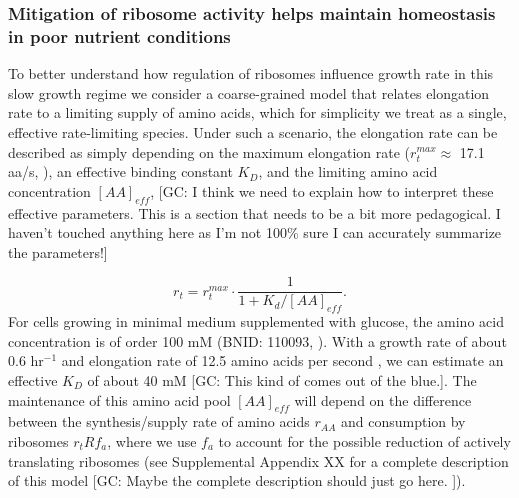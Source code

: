 \subsubsection{Mitigation of ribosome activity helps maintain homeostasis in
poor nutrient conditions}

To better understand how regulation of ribosomes influence growth rate in this
slow growth regime  we consider a coarse-grained model that relates elongation
rate to a limiting supply of amino acids, which for simplicity we treat as a
single, effective rate-limiting species. Under such a scenario, the elongation
rate can be described as simply depending on the maximum elongation rate
($r_t^{max} \approx$ 17.1 aa/s, \citep{dai2016, dai2018}), an effective binding
constant $K_D$, and the limiting amino acid concentration $[AA]_{eff}$,
{\color{red}[GC: I think we need to explain how to interpret these effective
parameters. This is a section that needs to be a bit more pedagogical. I haven't
touched anything here as I'm not 100\% sure I can accurately summarize the parameters!]}

\begin{equation}
r_t = r_t^{max} \cdot \frac{1}{1 + K_d / [AA]_{eff}}.
\label{eq:rate_Kd}
\end{equation}
For cells growing in minimal medium supplemented with glucose, the amino acid concentration is of
order 100 mM (BNID: 110093, \citep{milo2010, bennett2009}). With a growth rate
of about 0.6 hr$^{-1}$ and elongation rate of 12.5 amino acids per second
\citep{dai2016}, we can estimate an effective $K_D$ of about 40 mM
{\color{red}[GC: This kind of comes out of the blue.]}. The
maintenance of this amino acid pool $[AA]_{eff}$ will depend on the difference
between the synthesis/supply rate of amino acids $r_{AA}$ and consumption by
ribosomes $r_t Rf_a$, where we use $f_a$ to account for the
possible reduction of actively translating ribosomes (see Supplemental Appendix
XX for a complete description of this model {\color{red}[GC: Maybe the complete
description should just go here. ]}).

